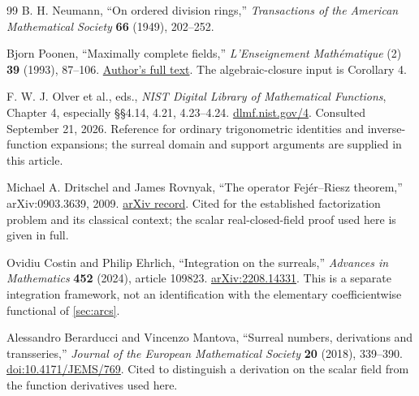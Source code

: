 \documentclass[11pt]{article}
\numberwithin{equation}{section}
\theoremstyle{definition}
\begin{document}
\begin{thebibliography}{99}
B. H. Neumann, ``On ordered division rings,''
\emph{Transactions of the American Mathematical Society} \textbf{66} (1949), 202--252.

Bjorn Poonen, ``Maximally complete fields,''
\emph{L'Enseignement Math\'ematique} (2) \textbf{39} (1993), 87--106.
\href{https://math.mit.edu/~poonen/papers/amsval.pdf}{Author's full text}.
The algebraic-closure input is Corollary 4.

F. W. J. Olver et al., eds., \emph{NIST Digital Library of Mathematical Functions},
Chapter 4, especially \S\S4.14, 4.21, 4.23--4.24.
\href{https://dlmf.nist.gov/4}{dlmf.nist.gov/4}.
Consulted September 21, 2026. Reference for ordinary trigonometric identities and inverse-function expansions; the surreal domain and support arguments are supplied in this article.

Michael A. Dritschel and James Rovnyak, ``The operator Fej\'er--Riesz theorem,''
arXiv:0903.3639, 2009.
\href{https://arxiv.org/abs/0903.3639}{arXiv record}.
Cited for the established factorization problem and its classical context; the scalar real-closed-field proof used here is given in full.

Ovidiu Costin and Philip Ehrlich, ``Integration on the surreals,''
\emph{Advances in Mathematics} \textbf{452} (2024), article 109823.
\href{https://arxiv.org/abs/2208.14331}{arXiv:2208.14331}.
This is a separate integration framework, not an identification with the elementary coefficientwise functional of \cref{sec:arcs}.

Alessandro Berarducci and Vincenzo Mantova,
``Surreal numbers, derivations and transseries,''
\emph{Journal of the European Mathematical Society} \textbf{20} (2018), 339--390.
\href{https://doi.org/10.4171/JEMS/769}{doi:10.4171/JEMS/769}.
Cited to distinguish a derivation on the scalar field from the function derivatives used here.

\end{thebibliography}\endgroup
\end{document}
